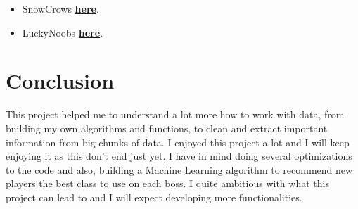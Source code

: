 \documentclass[12pt,a4paper]{article}
\begin{document}
    \begin{itemize}
        \item SnowCrows \href{https://snowcrows.com/}{\textbf{here}}.
        \item LuckyNoobs \href{https://lucky-noobs.com/}{\textbf{here}}.
    \end{itemize}

    \bigskip

    \section*{\large Conclusion}
    This project helped me to understand a lot more how to work with data, from building my own algorithms and
    functions, to clean and extract important information from big chunks of data. I enjoyed this project a lot and I
    will keep enjoying it as this don't end just yet. I have in mind doing several optimizations to the code and also,
    building a Machine Learning algorithm to recommend new players the best class to use on each boss. I quite ambitious
    with what this project can lead to and I will expect developing more functionalities.
\end{document}
